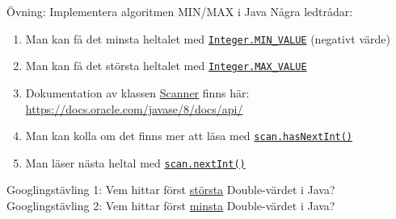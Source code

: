 \documentclass{lecturenotes}
\begin{document}
\begin{Slide}{Övning: Implementera algoritmen MIN/MAX i Java}
\footnotesize
Några ledtrådar:
\begin{enumerate}
\item Man kan få det minsta heltalet med \href{https://docs.oracle.com/javase/8/docs/api/java/lang/Integer.html}{\lstinline{Integer.MIN_VALUE}} (negativt värde)
\item Man kan få det största heltalet med \href{https://docs.oracle.com/javase/8/docs/api/java/lang/Integer.html}{\lstinline{Integer.MAX_VALUE}}
\item Dokumentation av klassen \href{https://docs.oracle.com/javase/8/docs/api/java/util/Scanner.html}{Scanner} finns här: \url{https://docs.oracle.com/javase/8/docs/api/}
\item Man kan kolla om det finns mer att läsa med \href{https://docs.oracle.com/javase/8/docs/api/java/util/Scanner.html#hasNextInt--}{\lstinline{scan.hasNextInt()}}
\item Man läser nästa heltal med  \href{http://docs.oracle.com/javase/8/docs/api/java/util/Scanner.html#nextInt%28%29}{\lstinline{scan.nextInt()}}
\end{enumerate}
\vspace{2em}
\scriptsize Googlingstävling 1: Vem hittar först \underline{största} Double-värdet i Java? \\ Googlingstävling 2: Vem hittar först \underline{minsta} Double-värdet i Java?
\end{Slide}

\end{document}
